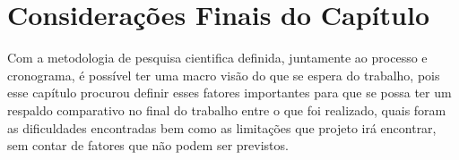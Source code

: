     \section{Considerações Finais do Capítulo}

        Com a metodologia de pesquisa cientifica definida, juntamente ao processo e cronograma, é possível ter uma macro
        visão do que se espera do trabalho, pois esse capítulo procurou definir esses fatores importantes para que se possa
        ter um respaldo comparativo no final do trabalho entre o que foi realizado, quais foram as dificuldades encontradas
        bem como as limitações que projeto irá encontrar, sem contar de fatores que não podem ser previstos.
